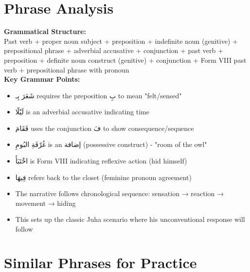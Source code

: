 \documentclass[letter,12pt]{article}
\begin{document}
\section{Phrase Analysis}
\begin{tcolorbox}[colback=boxcolor,colframe=headercolor,breakable]
\textbf{Grammatical Structure:}\\
Past verb + proper noun subject + preposition + indefinite noun (genitive) + prepositional phrase + adverbial accusative + conjunction + past verb + preposition + definite noun construct (genitive) + conjunction + Form VIII past verb + prepositional phrase with pronoun \\

\textbf{Key Grammar Points:}
\begin{itemize}
\item \textarabic{شَعَرَ بِـ} requires the preposition \textarabic{بِ} to mean "felt/sensed"
\item \textarabic{لَيْلًا} is an adverbial accusative indicating time
\item \textarabic{فَقَامَ} uses the conjunction \textarabic{فَ} to show consequence/sequence
\item \textarabic{غُرْفَةِ البُومِ} is an إضافة (possessive construct) - "room of the owl"
\item \textarabic{اخْتَبَأَ} is Form VIII indicating reflexive action (hid himself)
\item \textarabic{فِيهَا} refers back to the closet (feminine pronoun agreement)
\item The narrative follows chronological sequence: sensation → reaction → movement → hiding
\item This sets up the classic Juha scenario where his unconventional response will follow
\end{itemize}
\end{tcolorbox}

\section{Similar Phrases for Practice}
\end{document}
